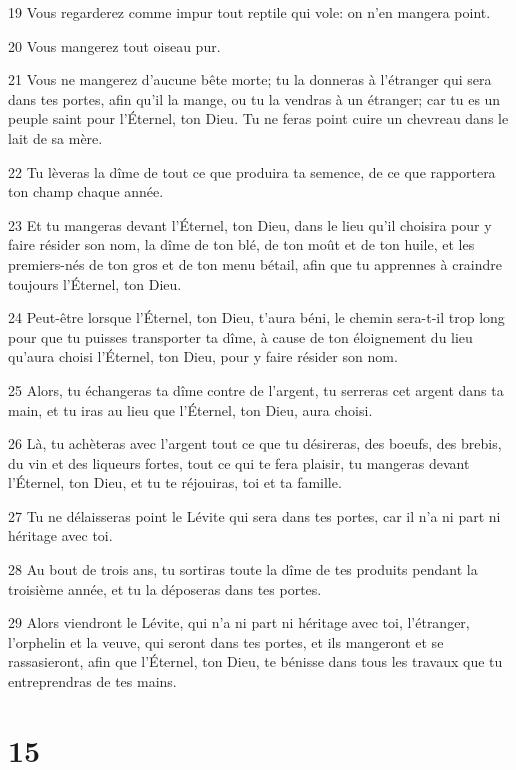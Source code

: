 \par 19 Vous regarderez comme impur tout reptile qui vole: on n'en mangera point.
\par 20 Vous mangerez tout oiseau pur.
\par 21 Vous ne mangerez d'aucune bête morte; tu la donneras à l'étranger qui sera dans tes portes, afin qu'il la mange, ou tu la vendras à un étranger; car tu es un peuple saint pour l'Éternel, ton Dieu. Tu ne feras point cuire un chevreau dans le lait de sa mère.
\par 22 Tu lèveras la dîme de tout ce que produira ta semence, de ce que rapportera ton champ chaque année.
\par 23 Et tu mangeras devant l'Éternel, ton Dieu, dans le lieu qu'il choisira pour y faire résider son nom, la dîme de ton blé, de ton moût et de ton huile, et les premiers-nés de ton gros et de ton menu bétail, afin que tu apprennes à craindre toujours l'Éternel, ton Dieu.
\par 24 Peut-être lorsque l'Éternel, ton Dieu, t'aura béni, le chemin sera-t-il trop long pour que tu puisses transporter ta dîme, à cause de ton éloignement du lieu qu'aura choisi l'Éternel, ton Dieu, pour y faire résider son nom.
\par 25 Alors, tu échangeras ta dîme contre de l'argent, tu serreras cet argent dans ta main, et tu iras au lieu que l'Éternel, ton Dieu, aura choisi.
\par 26 Là, tu achèteras avec l'argent tout ce que tu désireras, des boeufs, des brebis, du vin et des liqueurs fortes, tout ce qui te fera plaisir, tu mangeras devant l'Éternel, ton Dieu, et tu te réjouiras, toi et ta famille.
\par 27 Tu ne délaisseras point le Lévite qui sera dans tes portes, car il n'a ni part ni héritage avec toi.
\par 28 Au bout de trois ans, tu sortiras toute la dîme de tes produits pendant la troisième année, et tu la déposeras dans tes portes.
\par 29 Alors viendront le Lévite, qui n'a ni part ni héritage avec toi, l'étranger, l'orphelin et la veuve, qui seront dans tes portes, et ils mangeront et se rassasieront, afin que l'Éternel, ton Dieu, te bénisse dans tous les travaux que tu entreprendras de tes mains.

\chapter{15}

